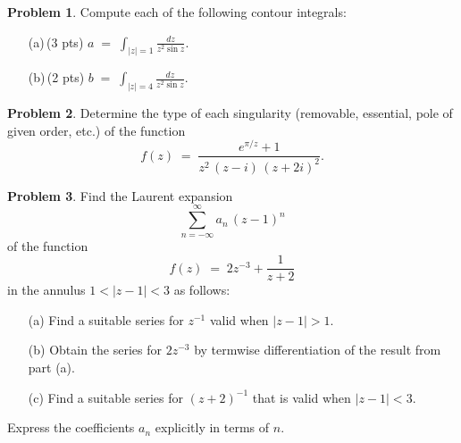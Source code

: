 \documentclass[10pt]{article}
\theoremstyle{definition} %
\newtheorem{problem}{Problem}
\theoremstyle{plain} %
\begin{document}
                          \begin{problem}
                          Compute each of the following contour integrals:
                          \begin{enumerate}\itemsep4pt
                            \item[(a)\,(3 pts)]  \(\displaystyle 
                                  a \;=\; \int_{\lvert z\rvert = 1} \frac{dz}{z^{2}\sin z}.
                                  \)
                            \item[(b)\,(2 pts)]  \(\displaystyle 
                                  b \;=\; \int_{\lvert z\rvert = 4} \frac{dz}{z^{2}\sin z}.
                                  \)
                          \end{enumerate}
                          \end{problem}
                          
                          \begin{problem}
                          Determine the type of each singularity (removable, essential, pole of given order, etc.) of the function
                          \[
                            f(z)\;=\;\frac{e^{\pi / z}+1}{z^{2}\,(z-i)\,(z+2i)^{2}}.
                          \]
                          \end{problem}
                          
                          \begin{problem}
                          Find the Laurent expansion
                          \[
                            \sum_{n=-\infty}^{\infty} a_{n}\,(z-1)^{n}
                          \]
                          of the function
                          \[
                            f(z)\;=\;2z^{-3}+\frac{1}{z+2}
                          \]
                          in the annulus \(1<\lvert z-1\rvert<3\) as follows:
                          \begin{enumerate}\itemsep4pt
                            \item[(a)] Find a suitable series for \(z^{-1}\) valid when \(\lvert z-1\rvert>1\).
                            \item[(b)] Obtain the series for \(2z^{-3}\) by termwise differentiation of the result from part (a).
                            \item[(c)] Find a suitable series for \((z+2)^{-1}\) that is valid when \(\lvert z-1\rvert<3\).
                          \end{enumerate}
                          Express the coefficients \(a_{n}\) explicitly in terms of \(n\).
                          \end{problem}
                          
\end{document}
